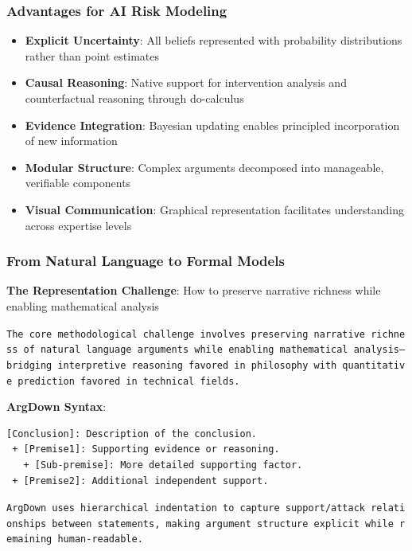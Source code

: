 \documentclass[
  11pt,
  letterpaper,
]{book}
\providecommand{\tightlist}{%
  \setlength{\itemsep}{0pt}\setlength{\parskip}{0pt}}
\begin{document}
\subsubsection{Advantages for AI Risk
Modeling}\label{sec-modeling-advantages}

\begin{itemize}
\tightlist
\item
  \textbf{Explicit Uncertainty}: All beliefs represented with
  probability distributions rather than point estimates
\item
  \textbf{Causal Reasoning}: Native support for intervention analysis
  and counterfactual reasoning through do-calculus
\item
  \textbf{Evidence Integration}: Bayesian updating enables principled
  incorporation of new information
\item
  \textbf{Modular Structure}: Complex arguments decomposed into
  manageable, verifiable components
\item
  \textbf{Visual Communication}: Graphical representation facilitates
  understanding across expertise levels
\end{itemize}

\subsubsection{From Natural Language to Formal
Models}\label{sec-natural-to-formal}

\textbf{The Representation Challenge}: How to preserve narrative
richness while enabling mathematical analysis

\texttt{The\ core\ methodological\ challenge\ involves\ preserving\ narrative\ richness\ of\ natural\ language\ arguments\ while\ enabling\ mathematical\ analysis—bridging\ interpretive\ reasoning\ favored\ in\ philosophy\ with\ quantitative\ prediction\ favored\ in\ technical\ fields.}

\textbf{ArgDown Syntax}:

\begin{verbatim}
[Conclusion]: Description of the conclusion.
 + [Premise1]: Supporting evidence or reasoning.
   + [Sub-premise]: More detailed supporting factor.
 + [Premise2]: Additional independent support.
\end{verbatim}

\texttt{ArgDown\ uses\ hierarchical\ indentation\ to\ capture\ support/attack\ relationships\ between\ statements,\ making\ argument\ structure\ explicit\ while\ remaining\ human-readable.}
\end{document}
